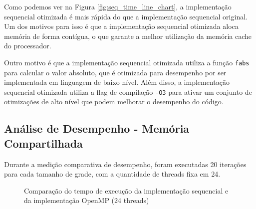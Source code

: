 \documentclass[conference]{IEEEtran}
\begin{document}
Como podemos ver na Figura \ref{fig:seq_time_line_chart}, a implementação sequencial otimizada é mais rápida do que a implementação sequencial original. Um dos motivos para isso é que a implementação sequencial otimizada aloca memória de forma contígua, o que garante a melhor utilização da memória cache do processador.

Outro motivo é que a implementação sequencial otimizada utiliza a função \texttt{fabs} para calcular o valor absoluto, que é otimizada para desempenho por ser implementada em linguagem de baixo nível. Além disso, a implementação sequencial otimizada utiliza a flag de compilação \texttt{-O3} para ativar um conjunto de otimizações de alto nível que podem melhorar o desempenho do código.

\subsection{Análise de Desempenho - Memória Compartilhada}

Durante a medição comparativa de desempenho, foram executadas 20 iterações para cada tamanho de grade, com a quantidade de threads fixa em 24.

\begin{figure}[H]
    \centering
    \caption{Comparação do tempo de execução da implementação sequencial e da implementação OpenMP (24 threads)}
    \label{fig:seq_omp_time_line_chart}
\end{figure}
\end{document}
